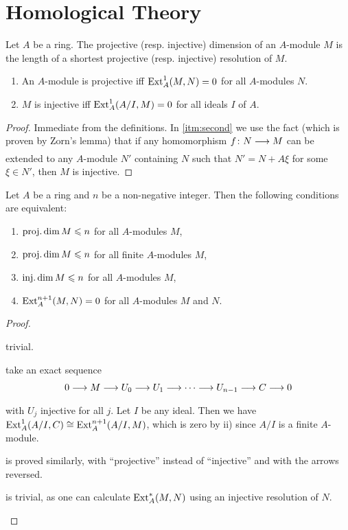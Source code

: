 \documentclass[../main]{subfiles}
\begin{document}
\section{Homological Theory}\label{sec:18}

\newparagraph Let $A$ be a ring. The projective (resp. injective) dimension of an $A$-module $M$ is the length of a shortest projective (resp. injective) resolution of $M$. 

\begin{lemma}\leavevmode\label{lem:18.01}
\begin{enumerate}[label=(\roman*)]
    \item An $A$-module is projective iff $\operatorname{Ext}_A^1(M,N)=0$ for all $A$-modules $N$. 
    \item $M$ is injective iff $\operatorname{Ext}_A^1(A/I,M)=0$ for all ideals $I$ of $A$.\label{itm:second} 
\end{enumerate}
\end{lemma}
\begin{proof}
Immediate from the definitions. In \ref{itm:second} we use the fact (which is proven by Zorn's lemma) that if any homomorphism $f\colon N \varrightarrow{} M$ can be extended to any $A$-module $N'$ containing $N$ such that $N'=N+A\xi$ for some $\xi \in N'$, then $M$ is injective.
\end{proof}
\begin{lemma}\label{lem:18.02}
Let $A$ be a ring and $n$ be a non-negative integer. Then the following conditions are equivalent$\colon$
\begin{enumerate}[label=(\arabic*)]
    \item \label{lem:18.02.1}$\operatorname{proj. dim} M \leqslant n$ for all $A$-modules $M$,
    \item \label{lem:18.02.2}$\operatorname{proj. dim} M \leqslant n$ for all finite $A$-modules $M$,
    \item \label{lem:18.02.3}$\operatorname{inj. dim} M \leqslant n$ for all $A$-modules $M$,
    \item \label{lem:18.02.4}$\operatorname{Ext}_A^{n+1}(M,N)=0$ for all $A$-modules $M$ and $N$.
\end{enumerate}
\end{lemma}
\begin{proof}\phantom{,}
\begin{implyenumerate}
    \item[(1) $\implies$ (2)] trivial.
    \item[(2) $\implies$ (3)] take an exact sequence \[0 \varrightarrow{} M \varrightarrow{} U_0 \varrightarrow{} U_1 \varrightarrow{} \cdots \varrightarrow{} U_{n-1}\varrightarrow{} C \varrightarrow{} 0\] with $U_j$ injective for all $j$. Let $I$ be any ideal. Then we have\newline $\operatorname{Ext}_A^1 (A/I,C) \cong \operatorname{Ext}_A^{n+1}(A/I,M)$, which is zero by ii) since $A/I$ is a finite $A$-module.
    \item[(4) $\implies$ (1)] is proved similarly, with ``projective'' instead of ``injective'' and with the arrows reversed.
    \item[(3) $\implies$ (4)] is trivial, as one can calculate $\operatorname{Ext}_A^*(M,N)$ using an injective resolution of $N$.
\end{implyenumerate}
\end{proof}
\end{document}
